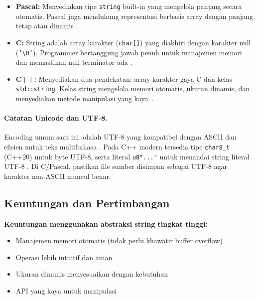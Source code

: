 \documentclass[../main.tex]{subfiles}
\begin{document}
\begin{itemize}
  \item \textbf{Pascal:} Menyediakan tipe \texttt{string} built-in yang mengelola panjang secara otomatis. Pascal juga mendukung representasi berbasis array dengan panjang tetap atau dinamis \parencite{pascal-tutorial-wikibooks,free-pascal-docs}.
  
  \item \textbf{C:} String adalah array karakter (\texttt{char[]}) yang diakhiri dengan karakter null (\texttt{'\textbackslash 0'}). Programmer bertanggung jawab penuh untuk manajemen memori dan memastikan null terminator ada \parencite{iso-c-draft-n1570,c-strings-h,tutorialspoint-c-strings}.
  
  \item \textbf{C++:} Menyediakan dua pendekatan: array karakter gaya C dan kelas \texttt{std::\allowbreak string}. Kelas string mengelola memori otomatis, ukuran dinamis, dan menyediakan metode manipulasi yang kaya~\parencite{cpp-strings,cplusplus-string,yuliaagustin-string-cpp}.
\end{itemize}

\paragraph{Catatan Unicode dan UTF-8.} Encoding umum saat ini adalah UTF-8 yang kompatibel dengan ASCII dan efisien untuk teks multibahasa \parencite{rfc3629,utf8-everywhere}. Pada C++ modern tersedia tipe \texttt{char8\_t} (C++20) untuk byte UTF-8, serta literal \texttt{u8"..."} untuk menandai string literal UTF-8 \parencite{cpp-char8,cpp-string-literals}. Di C/Pascal, pastikan file sumber disimpan sebagai UTF-8 agar karakter non-ASCII muncul benar.

\subsection{Keuntungan dan Pertimbangan}

\textbf{Keuntungan menggunakan abstraksi string tingkat tinggi:}
\begin{itemize}
  \item Manajemen memori otomatis (tidak perlu khawatir buffer overflow)
  \item Operasi lebih intuitif dan aman
  \item Ukuran dinamis menyesuaikan dengan kebutuhan
  \item API yang kaya untuk manipulasi
\end{itemize}
\end{document}
